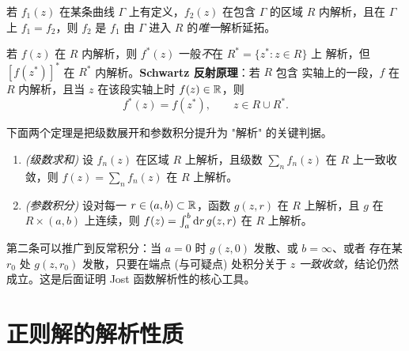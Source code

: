 \begin{theorem}[解析延拓的唯一性]
若 $f_1(z)$ 在某条曲线 $\Gamma$ 上有定义，$f_2(z)$ 在包含 $\Gamma$ 的区域 $R$
内解析，且在 $\Gamma$ 上 $f_1=f_2$，则 $f_2$ 是 $f_1$ 由 $\Gamma$ 进入 $R$
的\emph{唯一}解析延拓。
\end{theorem}

\begin{remark}\label{rem:schwartz}
若 $f(z)$ 在 $R$ 内解析，则 $f^*(z)$ 一般\emph{不}在 $R^*=\{z^*:z\in R\}$ 上
解析，但 $[f(z^*)]^*$ 在 $R^*$ 内解析。\textbf{Schwartz 反射原理}：若 $R$ 包含
实轴上的一段，$f$ 在 $R$ 内解析，且当 $z$ 在该段实轴上时 $f(z)\in\mathbb{R}$，则
\begin{equation}
f^*(z) = f(z^*),\qquad z\in R\cup R^*.
\label{eq:schwartz}
\end{equation}
\end{remark}

下面两个定理是把级数展开和参数积分提升为 "解析" 的关键判据。

\begin{theorem}[级数与积分给出的解析函数]\label{thm:series-integral}
\hfill
\begin{enumerate}
\item\emph{(级数求和)}\; 设 $f_n(z)$ 在区域 $R$ 上解析，且级数
$\sum_n f_n(z)$ 在 $R$ 上一致收敛，则 $f(z)=\sum_n f_n(z)$ 在 $R$ 上解析。
\item\emph{(参数积分)}\; 设对每一 $r\in(a,b)\subset\mathbb{R}$，函数 $g(z,r)$ 在 $R$
上解析，且 $g$ 在 $R\times(a,b)$ 上连续，则
$f(z)=\int_a^b\mathrm{d} r\,g(z,r)$ 在 $R$ 上解析。
\end{enumerate}
\end{theorem}

\begin{remark}\label{rem:improper}
第二条可以推广到反常积分：当 $a=0$ 时 $g(z,0)$ 发散、或 $b=\infty$、或者
存在某 $r_0$ 处 $g(z,r_0)$ 发散，只要在端点 (与可疑点) 处积分关于 $z$
\emph{一致收敛}，结论仍然成立。这是后面证明 Jost 函数解析性的核心工具。
\end{remark}

\section{正则解的解析性质}\label{sec:regular-analytic}

